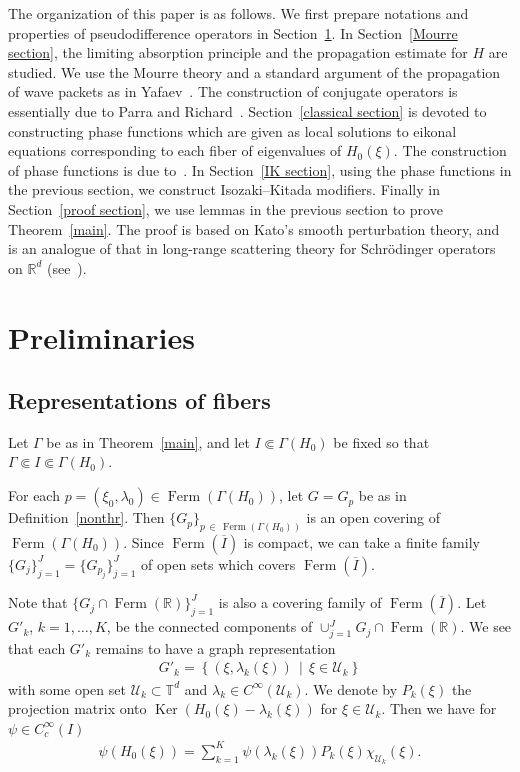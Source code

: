 \documentclass[AHL,Unicode,longabstracts,published]{cedram}
\newcommand{\Schr}{Schr\"odinger }
\newcommand{\ps}{\psi}
\renewcommand{\l}{\lambda}
\newcommand{\x}{\xi}
\newcommand{\R}{\mathbb{R}}
\newcommand{\T}{\mathbb{T}}
\newcommand{\US}{\mathcal{U}}
\DeclareMathOperator{\kerr}{Ker}
\DeclareMathOperator{\Ferm}{Ferm}
\newcommand{\R}{\mathbb{R}}
\begin{document}
The organization of this paper is as follows. We first prepare notations and properties of pseudodifference operators in Section~\ref{notations sec}. In Section~\ref{Mourre section}, the limiting absorption principle and the propagation estimate for $H$ are studied. We use the Mourre theory and a standard argument of the propagation of wave packets as in Yafaev~\cite[Chapter~10]{Y}. The construction of conjugate operators is essentially due to Parra and Richard~\cite{P-R}. Section~\ref{classical section} is devoted to constructing phase functions which are given as local solutions to eikonal equations corresponding to each fiber of eigenvalues of $H_0(\x)$. The construction of phase functions is due to~\cite{N3}. In Section~\ref{IK section}, using the phase functions in the previous section, we construct Isozaki--Kitada modifiers. Finally in Section~\ref{proof section}, we use lemmas in the previous section to prove Theorem~\ref{main}. The proof is based on Kato's smooth perturbation theory, and is an analogue of that in long-range scattering theory for \Schr operators on $\R^d$ (see~\cite{Y}).



\section{Preliminaries}\label{notations sec}



\subsection{Representations of fibers}

Let $\Gamma$ be as in Theorem~\ref{main}, and let $I \Subset \Gamma(H_0)$ be fixed so that $\Gamma \Subset I \Subset \Gamma(H_0)$.

For each $p=(\x_0,\l_0) \in \Ferm(\Gamma(H_0))$, let $G=G_p$ be as in Definition~\ref{nonthr}. Then $\{ G_p \}_{p\,\in\,\Ferm(\Gamma(H_0))}$ is an open covering of $\Ferm(\Gamma(H_0))$. Since $\Ferm(\overline{I})$ is compact, we can take a finite family $\{ G_{j} \}_{j=1}^J = \{ G_{p_j} \}_{j=1}^J$ of open sets which covers $\Ferm(\overline{I})$.

Note that $\{ G_j \cap \Ferm(\R) \}_{j=1}^J$ is also a covering family of $\Ferm(\overline{I})$. Let $G'_k$, $k=1,\dots,K$, be the connected components of $\cup_{j=1}^J G_j \cap \Ferm(\R)$. We see that each $G'_k$ remains to have a graph representation
\begin{align}\label{G_k representation}
G'_k=\left\{ (\x,\l_k(\x)) \,\middle|\, \x \in \US_k \right\}
\end{align}
with some open set $\US_k \subset \T^d$ and $\l_k\in C^\infty(\US_k)$. We denote by $P_k(\x)$ the projection matrix onto $\kerr (H_0(\x)-\l_k(\x))$ for $\x\in \US_k$. Then we have for $\psi\in C_c^\infty(I)$
\begin{align}\label{Rep of E_H0}
\ps(H_0(\x)) = \sum_{k=1}^K \ps(\l_k(\x)) P_k(\x) \chi_{\US_k}(\x).
\end{align}
\end{document}
